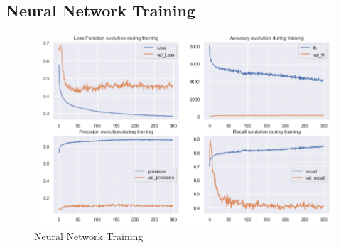 \subsection{Neural Network Training}
\begin{figure}[H]
    \centering
    \includegraphics[width=\linewidth]{figures/nn_training.PNG}
    \caption{Neural Network Training}
    \label{fig:cm_rf_full}
\end{figure}